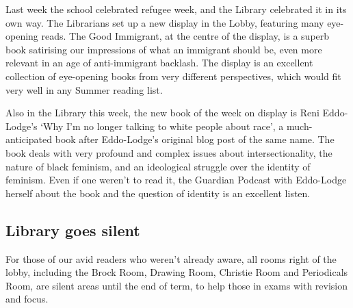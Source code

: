 Last week the school celebrated refugee week, and the Library celebrated it in its own way. The Librarians set up a new display in the Lobby, featuring many eye-opening reads. The Good Immigrant, at the centre of the display, is a superb book satirising our impressions of what an immigrant should be, even more relevant in an age of anti-immigrant backlash. The display is an excellent collection of eye-opening books from very different perspectives, which would fit very well in any Summer reading list.

Also in the Library this week, the new book of the week on display is Reni Eddo-Lodge’s ‘Why I'm no longer talking to white people about race’, a much-anticipated book after Eddo-Lodge’s original blog post of the same name. The book deals with very profound and complex issues about intersectionality, the nature of black feminism, and an ideological struggle over the identity of feminism. Even if one weren’t to read it, the Guardian Podcast with Eddo-Lodge herself about the book and the question of identity is an excellent listen.

\subsection{Library goes silent}

For those of our avid readers who weren’t already aware, all rooms right of the lobby, including the Brock Room, Drawing Room, Christie Room and Periodicals Room, are silent areas until the end of term, to help those in exams with revision and focus.
